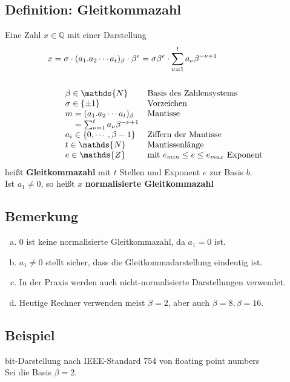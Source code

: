 \documentclass[ngerman,fontsize=11pt, paper=a4, parskip=half, titlepage=true, toc=bib]{scrbook}
\newcommand{\Q}{\mathds{Q}}
\newcommand{\N}{\mathds{N}}
\newcommand{\Z}{\mathds{Z}}
\begin{document}
\subsection{Definition: Gleitkommazahl} \label{3.1.1} 
Eine Zahl $x\in\Q$ mit einer Darstellung
\begin{align*}
	x&=\sigma \cdot(a_1 . a_2 \cdots a_t)_{\beta}\cdot \beta^e 
	 = \sigma\beta^e \cdot \sum_{\nu=1}^{t}a_\nu \beta^{-\nu+1}\\\\
&\quad\begin{array}{ll}
	\beta\in\N & \text{Basis des Zahlensystems}\index{Basis}\\
	\sigma \in\{\pm 1\} &\text{Vorzeichen} \\
	m = (a_1 . a_2 \cdots a_t)_{\beta} &\text{Mantisse}\index{Mantisse}\\
	\phantom{m}= \sum_{\nu=1}^{t}a_\nu \beta^{-\nu+1} \\
	a_i \in\{0,\cdots , \beta-1\}&\text{Ziffern der Mantisse}\\
	t\in\N&\text{Mantissenlänge} \\
	e\in\Z &\text{mit }e_{min}\leq e \leq e_{max} \text{ Exponent}
\end{array}
\end{align*}
heißt \textbf{Gleitkommazahl} mit $t$ Stellen und Exponent $e$ zur Basis $b$. \\
Ist $a_1\neq 0$, so heißt $x$ \textbf{normalisierte Gleitkommazahl}

\subsection{Bemerkung} \label{3.1.2}
\begin{enumerate}[a)]
	\item 0 ist keine normalisierte Gleitkommazahl, da $a_1 =  0$ ist.
	\item $a_1\neq 0$ stellt sicher, dass die Gleitkommadarstellung eindeutig ist.
	\item In der Praxis werden auch nicht-normalisierte Darstellungen verwendet.
	\item Heutige Rechner verwenden meist $\beta =2$, aber auch $\beta=8, \beta=16$.
\end{enumerate}

\subsection{Beispiel} \label{3.1.3}
 bit-Darstellung nach IEEE-Standard 754 von floating point numbers \\
 Sei die Basis $\beta=2$.
 
\end{document}
